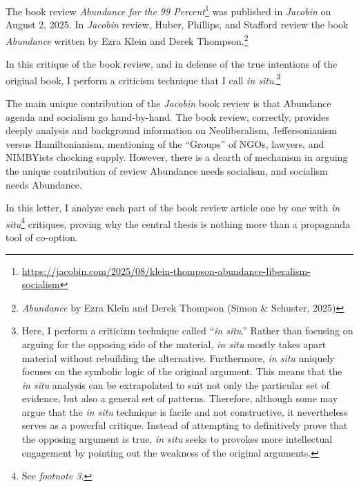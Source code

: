 \documentclass[12pt]{article}
\begin{document}


	The book review \textit{Abundance for the 99 Percent}\footnote{\href{https://jacobin.com/2025/08/klein-thompson-abundance-liberalism-socialism}{https://jacobin.com/2025/08/klein-thompson-abundance-liberalism-socialism}} was published in \textit{Jacobin} on August 2, 2025. In \textit{Jacobin} review, Huber, Phillips, and Stafford review the book \textit{Abundance} written by Ezra Klein and Derek Thompson.\footnote{\textit{Abundance} by Ezra Klein and Derek Thompson (Simon \& Schuster, 2025)}

	In this critique of the book review, and in defense of the true intentions of the original book, I perform a criticism technique that I call \textit{in situ}.\footnote{Here, I perform a criticizm technique called ``\textit{in situ}.'' Rather than focusing on arguing for the opposing side of the material, \textit{in situ} mostly takes apart material without rebuilding the alternative. Furthermore, \textit{in situ} uniquely focuses on the symbolic logic of the original argument. This means that the \textit{in situ} analysis can be extrapolated to suit not only the particular set of evidence, but also a general set of patterns. Therefore, although some may argue that the \textit{in situ} technique is facile and not constructive, it nevertheless serves as a powerful critique. Instead of attempting to definitively prove that the opposing argument is true, \textit{in situ} seeks to provokes more intellectual engagement by pointing out the weakness of the original arguments.}

The main unique contribution of the \textit{Jacobin} book review is that Abundance agenda and socialism go hand-by-hand. The book review, correctly, provides deeply analysis and background information on Neoliberalism, Jeffersonianism versus Hamiltonianism, mentioning of the ``Groups'' of NGOs, lawyers, and NIMBYists chocking supply. However, there is a dearth of mechanism in arguing the unique contribution of review\textemdash{} Abundance needs socialism, and socialism needs Abundance.

In this letter, I analyze each part of the book review article one by one with \textit{in situ}\footnote{See \textit{footnote 3}.} critiques, proving why the central thesis is nothing more than a propaganda tool of co-option.
\end{document}
